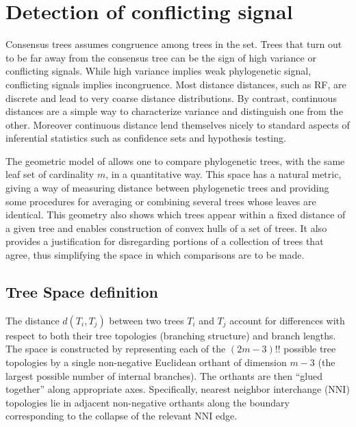 \section{Detection of conflicting signal} \label{sec:extensions}

Consensus trees assumes congruence among trees in the set. Trees that turn out to be far away from the consensus tree can be the sign of high variance or conflicting signals. While high variance implies weak phylogenetic signal, conflicting  signals implies incongruence. Most distance distances, such as RF, are discrete and lead to very coarse distance distributions. By contrast, continuous distances are a simple way to characterize variance and distinguish one from the other. Moreover continuous distance lend themselves nicely to standard aspects of inferential statistics such as confidence sets and hypothesis testing. 


The  geometric  model of \cite{Billera2001} allows one to compare phylogenetic  trees,  with  the  same  leaf  set  of  cardinality $m$, in a quantitative way.  This  space  has  a  natural  metric, giving a way of measuring distance between phylogenetic trees and providing some procedures for averaging or combining several trees whose leaves are identical. This geometry also shows which trees appear within a fixed distance of a given tree and enables construction of convex hulls of a
set of trees. It also provides a justification for disregarding portions of a collection of trees that agree,  thus simplifying the space in which comparisons are to be made.

\subsection{Tree Space definition} \label{sec:Tree-distances}
 The distance $d(T_i,T_j)$ between two trees $T_i$ and $T_j$ account for differences with respect to both their tree topologies (branching structure) and branch lengths. The space is constructed by representing each of the $(2m-3)!!$ possible tree topologies by a single non-negative Euclidean orthant of dimension $m-3$ (the largest possible number of internal branches). The orthants are then “glued together” along appropriate axes. Specifically, nearest neighbor interchange (NNI) topologies lie in adjacent non-negative orthants along the boundary corresponding to the collapse of the relevant NNI edge.

